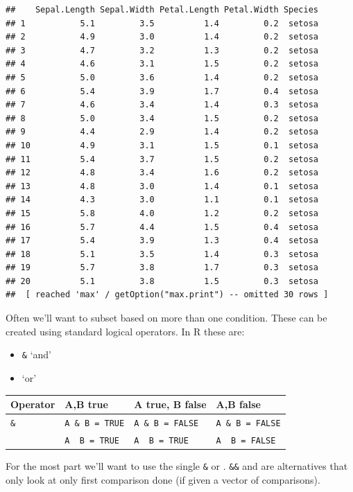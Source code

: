 \documentclass[
]{book}
\providecommand{\tightlist}{%
  \setlength{\itemsep}{0pt}\setlength{\parskip}{0pt}}
\theoremstyle{definition}
\theoremstyle{definition}
\theoremstyle{definition}
\theoremstyle{remark}
\begin{document}
\begin{verbatim}
##    Sepal.Length Sepal.Width Petal.Length Petal.Width Species
## 1           5.1         3.5          1.4         0.2  setosa
## 2           4.9         3.0          1.4         0.2  setosa
## 3           4.7         3.2          1.3         0.2  setosa
## 4           4.6         3.1          1.5         0.2  setosa
## 5           5.0         3.6          1.4         0.2  setosa
## 6           5.4         3.9          1.7         0.4  setosa
## 7           4.6         3.4          1.4         0.3  setosa
## 8           5.0         3.4          1.5         0.2  setosa
## 9           4.4         2.9          1.4         0.2  setosa
## 10          4.9         3.1          1.5         0.1  setosa
## 11          5.4         3.7          1.5         0.2  setosa
## 12          4.8         3.4          1.6         0.2  setosa
## 13          4.8         3.0          1.4         0.1  setosa
## 14          4.3         3.0          1.1         0.1  setosa
## 15          5.8         4.0          1.2         0.2  setosa
## 16          5.7         4.4          1.5         0.4  setosa
## 17          5.4         3.9          1.3         0.4  setosa
## 18          5.1         3.5          1.4         0.3  setosa
## 19          5.7         3.8          1.7         0.3  setosa
## 20          5.1         3.8          1.5         0.3  setosa
##  [ reached 'max' / getOption("max.print") -- omitted 30 rows ]
\end{verbatim}

Often we'll want to subset based on more than one condition. These can be created using standard logical operators. In R these are:

\begin{itemize}
\tightlist
\item
  \texttt{\&} `and'
\item
  \texttt{\textbar{}} `or'
\end{itemize}

\begin{longtable}[]{@{}llll@{}}
\toprule
Operator & A,B true & A true, B false & A,B false\tabularnewline
\midrule
\endhead
\texttt{\&} & \texttt{A\ \&\ B\ =\ TRUE} & \texttt{A\ \&\ B\ =\ FALSE} & \texttt{A\ \&\ B\ =\ FALSE}\tabularnewline
\texttt{\textbar{}} & \texttt{A\ \textbar{}\ B\ =\ TRUE} & \texttt{A\ \textbar{}\ B\ =\ TRUE} & \texttt{A\ \textbar{}\ B\ =\ FALSE}\tabularnewline
\bottomrule
\end{longtable}

For the most part we'll want to use the single \texttt{\&} or \texttt{\textbar{}}. \texttt{\&\&} and \texttt{\textbar{}\textbar{}} are alternatives that only look at only first comparison done (if given a vector of comparisons).
\end{document}

